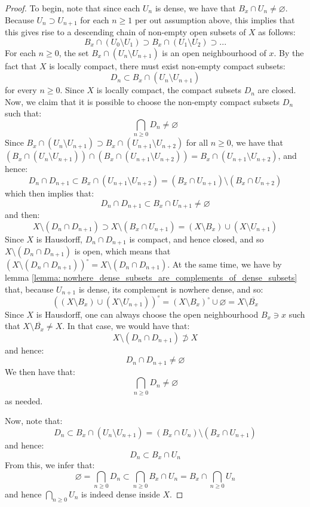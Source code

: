 \begin{proof}
                To begin, note that since each $U_n$ is dense, we have that $B_x \cap U_n \not = \varnothing$. Because $U_n \supset U_{n + 1}$ for each $n \geq 1$ per out assumption above, this implies that this gives rise to a descending chain of non-empty open subsets of $X$ as follows:
                    $$B_x \cap (U_0 \setminus U_1) \supset B_x \cap (U_1 \setminus U_2) \supset ...$$
                For each $n \geq 0$, the set $B_x \cap (U_n \setminus U_{n + 1})$ is an open neighbourhood of $x$. By the fact that $X$ is locally compact, there must exist non-empty compact subsets:
                    $$D_n \subset B_x \cap (U_n \setminus U_{n + 1})$$
                for every $n \geq 0$. Since $X$ is locally compact, the compact subsets $D_n$ are closed. Now, we claim that it is possible to choose the non-empty compact subsets $D_n$ such that:
                    $$\bigcap_{n \geq 0} D_n \not = \varnothing$$
                Since $B_x \cap (U_n \setminus U_{n + 1}) \supset B_x \cap (U_{n + 1} \setminus U_{n + 2})$ for all $n \geq 0$, we have that $(B_x \cap (U_n \setminus U_{n + 1})) \cap (B_x \cap (U_{n + 1} \setminus U_{n + 2})) = B_x \cap (U_{n + 1} \setminus U_{n + 2})$, and hence:
                    $$D_n \cap D_{n + 1} \subset B_x \cap (U_{n + 1} \setminus U_{n + 2}) = (B_x \cap U_{n + 1}) \setminus (B_x \cap U_{n + 2})$$
                which then implies that:
                    $$D_n \cap D_{n + 1} \subset B_x \cap U_{n + 1} \not = \varnothing$$
                and then:
                    $$X \setminus (D_n \cap D_{n + 1}) \supset X \setminus (B_x \cap U_{n + 1}) = (X \setminus B_x) \cup (X \setminus U_{n + 1})$$
                Since $X$ is Hausdorff, $D_n \cap D_{n + 1}$ is compact, and hence closed, and so $X \setminus (D_n \cap D_{n + 1})$ is open, which means that $(X \setminus (D_n \cap D_{n + 1}))^{\circ} = X \setminus (D_n \cap D_{n + 1})$. At the same time, we have by lemma \ref{lemma: nowhere_dense_subsets_are_complements_of_dense_subsets} that, because $U_{n + 1}$ is dense, its complement is nowhere dense, and so:
                    $$\left( (X \setminus B_x) \cup (X \setminus U_{n + 1}) \right)^{\circ} = (X \setminus B_x)^{\circ} \cup \varnothing = X \setminus \overline{B_x}$$
                Since $X$ is Hausdorff, one can always choose the open neighbourhood $B_x \ni x$ such that $X \setminus \overline{B_x} \not = X$. In that case, we would have that:
                    $$X \setminus (D_n \cap D_{n + 1}) \not \supset X$$
                and hence:
                    $$D_n \cap D_{n + 1} \not = \varnothing$$
                We then have that:
                    $$\bigcap_{n \geq 0} D_n \not = \varnothing$$
                as needed.
                    
                Now, note that:
                    $$D_n \subset B_x \cap (U_n \setminus U_{n + 1}) = (B_x \cap U_n) \setminus (B_x \cap U_{n + 1})$$
                and hence:
                    $$D_n \subset B_x \cap U_n$$
                From this, we infer that:
                    $$\varnothing = \bigcap_{n \geq 0} D_n \subset \bigcap_{n \geq 0} B_x \cap U_n = B_x \cap \bigcap_{n \geq 0} U_n$$
                and hence $\bigcap_{n \geq 0} U_n$ is indeed dense inside $X$.
            \end{proof}
